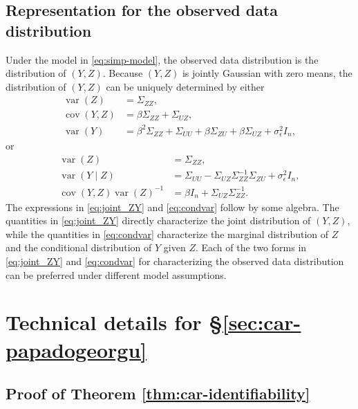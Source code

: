 \documentclass[11pt]{article}
\theoremstyle{definition}
\theoremstyle{remark}
\DeclareMathOperator{\var}{var}
\DeclareMathOperator{\cov}{cov}
\begin{document}
\subsection{
Representation for the observed data distribution
}
Under the model in \eqref{eq:simp-model}, 
the observed data distribution is the distribution of $(Y,Z)$. 
Because $(Y,Z)$ is jointly Gaussian with zero means, the distribution of $(Y,Z)$ can be uniquely determined by either
\begin{align}\label{eq:joint_ZY}
    \var(Z) & = \Sigma_{ZZ}, 
    \nonumber
    \\
    \cov(Y, Z) & = \beta \Sigma_{ZZ} + \Sigma_{UZ}, \nonumber
    \\
    \var(Y) & = \beta^2 \Sigma_{ZZ} + \Sigma_{UU} + \beta \Sigma_{ZU} + \beta \Sigma_{UZ} + \sigma^2_{\epsilon} I_n, 
\end{align}
or 
\begin{align}\label{eq:condvar}
    \var(Z) & = \Sigma_{ZZ},
    \nonumber
    \\
    \var(Y\mid Z) & = 
    \Sigma_{UU} - \Sigma_{UZ} \Sigma_{ZZ}^{-1}\Sigma_{ZU} + \sigma^2_\epsilon  I_n, \nonumber
    \\
    \cov(Y,Z) \var(Z)^{-1}
    & = \beta I_n + \Sigma_{UZ}\Sigma_{ZZ}^{-1}.
\end{align}
The expressions in \eqref{eq:joint_ZY} and \eqref{eq:condvar} follow by some algebra. 
The quantities in \eqref{eq:joint_ZY} directly characterize the joint distribution of $(Y,Z)$, while the quantities in \eqref{eq:condvar} characterize the marginal distribution of $Z$ and the conditional distribution of $Y$ given $Z$. 
Each of the two forms in \eqref{eq:joint_ZY} and \eqref{eq:condvar} for characterizing the observed data distribution can be preferred under different model assumptions. 





\section{Technical details for \S \ref{sec:car-papadogeorgu}}\label{sec:proofs-discrete-car}


\subsection{Proof of Theorem \ref{thm:car-identifiability}}
\label{sec:car-proofs}
\end{document}
